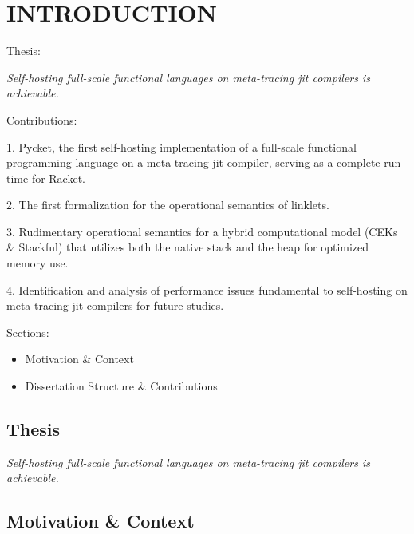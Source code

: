 \chapter[\texorpdfstring{INTRODUCTION}
                          {1. Introduction}]{INTRODUCTION}
    \label{chapter:introduction}

    \begin{chaptersynopsis}
        \footnotesize

       Thesis:

        \textit{Self-hosting full-scale functional languages on meta-tracing \gls{jit} compilers is achievable.}

        \vspace{2em}

        Contributions:

        1. Pycket, the first self-hosting implementation of a full-scale functional programming language on a meta-tracing \gls{jit} compiler, serving as a complete run-time for Racket.

        2. The first formalization for the operational semantics of linklets.

        3. Rudimentary operational semantics for a hybrid computational model (CEKs \& Stackful) that utilizes both the native stack and the heap for optimized memory use.

        4. Identification and analysis of performance issues fundamental to self-hosting on meta-tracing \gls{jit} compilers for future studies.

        \vspace{2em}

        Sections:
		\begin{itemize}
			\item Motivation \& Context
			\item Dissertation Structure \& Contributions
		\end{itemize}
    \end{chaptersynopsis}

    \section{Thesis}

    \textit{Self-hosting full-scale functional languages on meta-tracing \gls{jit} compilers is achievable.}

    \section[\texorpdfstring{Motivation \& Context}{Context}]{Motivation \& Context}

